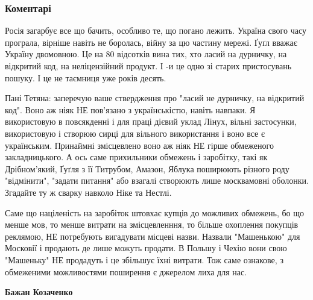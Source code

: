  
 
 
 
 
\subsubsection{Коментарі}
\label{sec:24_10_2021.fb.fb_group.obukrainjuvannja.1.google_mova.cmt}

\begin{itemize} %

Росія загарбує все що бачить, особливо те, що погано лежить. Україна свого часу
програла, вірніше навіть не боролась, війну за цю частину мережі. Ґуґл вважає
Україну двомовною. Це на 80 відсотків вина тих, хто ласий на дурничку, на
відкритий код, на неліцензійний продукт. І -и це одно зі старих пристосувань
пошуку. І це не таємниця уже років десять.

\begin{itemize} %

Пані Тетяна: заперечую ваше ствердження про "ласий не дурничку, на відкритий
код". Воно аж ніяк НЕ пов'язано з українськістю, навіть навпаки. Я використовую
в повсякденні і для праці дієвий уклад Лінух, вільні застосунки, використовую і
створюю сирці для вільного використання і воно все є українським. Принаймні
змісцевлено воно аж ніяк НЕ гірше обмеженого закладницького. А ось саме
прихильники обмежень і заробітку, такі як Дрібном'який, Ґуґля з її Титрубом,
Амазон, Яблука поширюють різного роду "відмінити", "задати питання" або взагалі
створюють лише москвамовні оболонки. Згадайте ту ж сварку навколо Ніке та
Нестлі.

Саме що націленість на заробіток штовхає купців до можливих обмежень, бо що
менше мов, то менше витрати на змісцевленння, то більше охоплення покупців
реклямою, НЕ потребують вигадувати місцеві назви. Назвали "Машенькою" для
Московії і продають де лише можуть продати. В Польшу і Чехію вони свою
"Машеньку" НЕ продадуть і це збільшує їхні витрати. Тож саме ознакове, з
обмеженими можливостями поширення є джерелом лиха для нас.

\begin{itemize} %
\textbf{Бажан Козаченко} 


\end{itemize}
\end{itemize}
\end{itemize}
